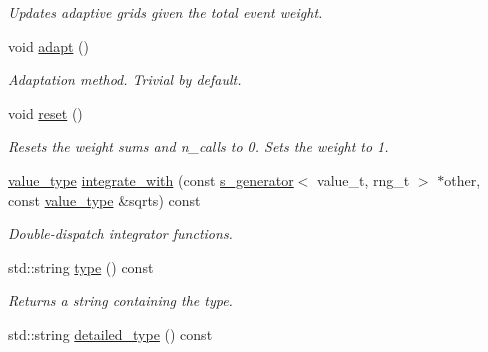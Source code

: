\begin{DoxyCompactItemize}
\begin{DoxyCompactList}\small\item\em Updates adaptive grids given the total event weight. \end{DoxyCompactList}\item 
\hypertarget{a00001_aad3d86a84f3fc66657500fa5bfeaf4c7}{void \hyperlink{a00001_aad3d86a84f3fc66657500fa5bfeaf4c7}{adapt} ()}\label{a00001_aad3d86a84f3fc66657500fa5bfeaf4c7}

\begin{DoxyCompactList}\small\item\em Adaptation method. Trivial by default. \end{DoxyCompactList}\item 
\hypertarget{a00001_a8083f3252ded95b8f48e0d5746b34a40}{void \hyperlink{a00001_a8083f3252ded95b8f48e0d5746b34a40}{reset} ()}\label{a00001_a8083f3252ded95b8f48e0d5746b34a40}

\begin{DoxyCompactList}\small\item\em Resets the weight sums and n\-\_\-calls to 0. Sets the weight to 1. \end{DoxyCompactList}\item 
\hypertarget{a00001_abbfd2f35259aae8afd97c9da8131a602}{\hyperlink{a00362_a3353150105036deac9bde097cbf1d8af}{value\-\_\-type} \hyperlink{a00001_abbfd2f35259aae8afd97c9da8131a602}{integrate\-\_\-with} (const \hyperlink{a00482}{s\-\_\-generator}$<$ value\-\_\-t, rng\-\_\-t $>$ $\ast$other, const \hyperlink{a00362_a3353150105036deac9bde097cbf1d8af}{value\-\_\-type} \&sqrts) const }\label{a00001_abbfd2f35259aae8afd97c9da8131a602}

\begin{DoxyCompactList}\small\item\em Double-\/dispatch integrator functions. \end{DoxyCompactList}\item 
\hypertarget{a00001_a732addc9e3db0cef6f0fa49c98ebdae3}{std\-::string \hyperlink{a00001_a732addc9e3db0cef6f0fa49c98ebdae3}{type} () const }\label{a00001_a732addc9e3db0cef6f0fa49c98ebdae3}

\begin{DoxyCompactList}\small\item\em Returns a string containing the type. \end{DoxyCompactList}\item 
\hypertarget{a00001_ab94b86df443a389e480c5d7f845e6523}{std\-::string \hyperlink{a00001_ab94b86df443a389e480c5d7f845e6523}{detailed\-\_\-type} () const }\label{a00001_ab94b86df443a389e480c5d7f845e6523}


\end{DoxyCompactItemize}
